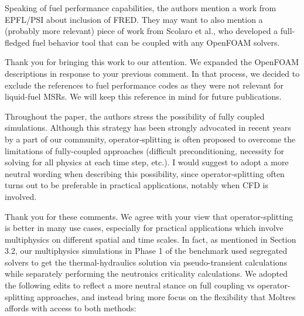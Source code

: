 \documentclass[answers,12pt]{exam}
\begin{document}
\begin{questions}
        \question Speaking of fuel performance capabilities, the authors
        mention a work from EPFL/PSI about inclusion of FRED. They may want to
        also mention a (probably more relevant) piece of work from Scolaro et
        al., who
        developed a full-fledged fuel behavior tool that can be coupled with
        any OpenFOAM solvers.
        \begin{solution}
        	Thank you for bringing this work to our attention. We expanded the
        	OpenFOAM descriptions in response to your previous comment. In
        	that process, we decided to exclude the references to fuel
        	performance codes as they were not relevant for liquid-fuel MSRs.
        	We will keep this reference in mind for future publications.
        \end{solution}

        \question Throughout the paper, the authors stress the possibility of fully coupled simulations. Although this strategy has been strongly advocated in recent years by a part of our community, operator-splitting is often proposed to overcome the limitations of fully-coupled approaches (difficult preconditioning, necessity for solving for all physics at each time step, etc.).  I would suggest to adopt a more neutral wording when describing this possibility, since operator-splitting often turns out to be preferable in practical applications, notably when CFD is involved.

        \begin{solution}
        	Thank you for these comments. We agree with your view that
        	operator-splitting is better in many use cases, especially for
        	practical applications which involve multiphysics on different
        	spatial and time scales. In fact, as mentioned in Section 3.2,
        	our multiphysics simulations in
        	Phase 1 of the benchmark used segregated solvers to get the
        	thermal-hydraulics solution via pseudo-transient calculations while
        	separately performing the neutronics criticality calculations. We
        	adopted the following edits to reflect a more neutral stance on
        	full coupling
        	vs operator-splitting approaches, and instead bring more focus on
        	the flexibility that Moltres affords with access to both methods:
        	

\end{solution}
\end{questions}
\end{document}
